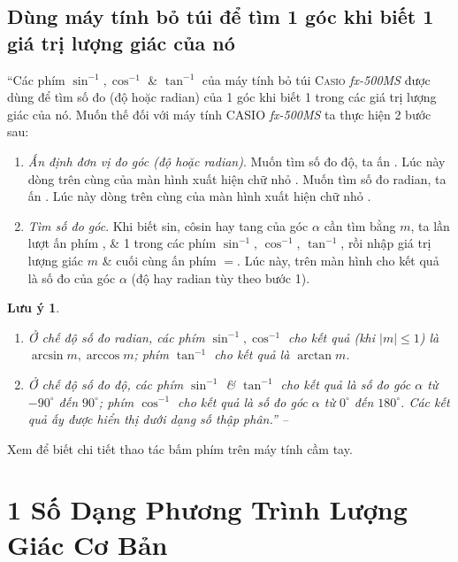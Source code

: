 \documentclass[oneside]{book}
\numberwithin{equation}{section}
\newtheorem{luuy}{Lưu ý}[section]
\begin{document}
\subsection{Dùng máy tính bỏ túi để tìm 1 góc khi biết 1 giá trị lượng giác của nó}
``Các phím $\sin^{-1},\cos^{-1}$ \& $\tan^{-1}$ của máy tính bỏ túi \textsc{Casio} \textit{fx-500MS} được dùng để tìm số đo (độ hoặc radian) của 1 góc khi biết 1 trong các giá trị lượng giác của nó. Muốn thế đối với máy tính CASIO \textit{fx-500MS} ta thực hiện 2 bước sau:
\begin{enumerate}
	\item \textit{Ấn định đơn vị đo góc (độ hoặc radian)}. Muốn tìm số đo độ, ta ấn    . Lúc này dòng trên cùng của màn hình xuất hiện chữ nhỏ . Muốn tìm số đo radian, ta ấn    . Lúc này dòng trên cùng của màn hình xuất hiện chữ nhỏ .
	\item \textit{Tìm số đo góc}. Khi biết sin, côsin hay tang của góc $\alpha$ cần tìm bằng $m$, ta lần lượt ấn phím , \& 1 trong các phím $\boxed{\sin^{-1}}$, $\boxed{\cos^{-1}}$, $\boxed{\tan^{-1}}$, rồi nhập giá trị lượng giác $m$ \& cuối cùng ấn phím $=$. Lúc này, trên màn hình cho kết quả là số đo của góc $\alpha$ (độ hay radian tùy theo bước 1).
\end{enumerate}

\begin{luuy}
	\begin{enumerate}
		\item Ở chế độ số đo radian, các phím $\sin^{-1},\cos^{-1}$ cho kết quả (khi $|m|\le 1$) là $\arcsin m,\arccos m$; phím $\tan^{-1}$ cho kết quả là $\arctan m$.
		\item Ở chế độ số đo độ, các phím $\sin^{-1}$ \& $\tan^{-1}$ cho kết quả là số đo góc $\alpha$ từ $-90^\circ$ đến $90^\circ$; phím $\cos^{-1}$ cho kết quả là số đo góc $\alpha$ từ $0^\circ$ đến $180^\circ$. Các kết quả ấy được hiển thị dưới dạng số thập phân.'' -- \cite[p. 27]{SGK_Toan_11_dai_so_giai_tich_nang_cao}
	\end{enumerate}
\end{luuy}
Xem \cite[Ví dụ 1--3, p. 31]{SGK_Toan_11_dai_so_giai_tich_nang_cao} để biết chi tiết thao tác bấm phím trên máy tính cầm tay.


\section{1 Số Dạng Phương Trình Lượng Giác Cơ Bản}
\end{document}
